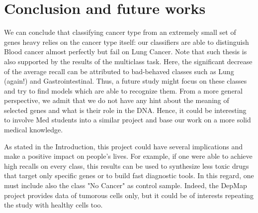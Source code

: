\documentclass[a4paper,11pt, oneside]{article}  %
\begin{document}
\section{Conclusion and future works}
We can conclude that classifying cancer type from an extremely small set of genes heavy relies on the cancer type itself: our classifiers are able to distinguish Blood cancer almost perfectly but fail on Lung Cancer.  Note that such thesis is also supported by the results of the multiclass task. Here, the significant decrease of the average recall can be attributed to bad-behaved classes such as Lung (again!) and Gastrointestinal. Thus, a future study might focus on these classes and try to find models which are able to recognize them.  From a more general perspective,  we admit that we do not have any hint about the meaning of selected genes and what is their role in the DNA.  Hence, it could be interesting to involve Med students into a similar project and base our work on a more solid medical knowledge.  

As stated in the Introduction, this project could have several implications and make a positive impact on people's lives. For example, if one were able to achieve high recalls on every class, this results can be used to synthesize less toxic drugs that target only specific genes or to build fast diagnostic tools. In this regard, one must include also the class "No Cancer" as control sample. Indeed, the DepMap project provides data of tumorous cells only,  but it could be of interests repeating the study with healthy cells too.  
\end{document}
